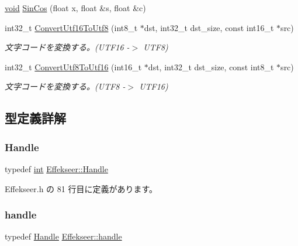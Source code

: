 \begin{DoxyCompactItemize}
\item 
\mbox{\hyperlink{namespace_effekseer_ab34c4088e512200cf4c2716f168deb56}{void}} \mbox{\hyperlink{namespace_effekseer_a4eab7724e1fc9c1cb66aac61b3d568d9}{Sin\+Cos}} (float x, float \&s, float \&c)
\item 
int32\+\_\+t \mbox{\hyperlink{namespace_effekseer_afcbbbacdf23834fd7e8619e3af4e837c}{Convert\+Utf16\+To\+Utf8}} (int8\+\_\+t $\ast$dst, int32\+\_\+t dst\+\_\+size, const int16\+\_\+t $\ast$src)
\begin{DoxyCompactList}\small\item\em 文字コードを変換する。(U\+T\+F16 -\/$>$ U\+T\+F8) \end{DoxyCompactList}\item 
int32\+\_\+t \mbox{\hyperlink{namespace_effekseer_abcfc5535cdc6dc92e50f8453cbb01214}{Convert\+Utf8\+To\+Utf16}} (int16\+\_\+t $\ast$dst, int32\+\_\+t dst\+\_\+size, const int8\+\_\+t $\ast$src)
\begin{DoxyCompactList}\small\item\em 文字コードを変換する。(U\+T\+F8 -\/$>$ U\+T\+F16) \end{DoxyCompactList}\end{DoxyCompactItemize}


\subsection{型定義詳解}
\mbox{\label{namespace_effekseer_afba58b8d812da862190e9bbfc040824a}} 
\subsubsection{\texorpdfstring{Handle}{Handle}}
{\footnotesize\ttfamily typedef \mbox{\hyperlink{namespace_effekseer_ace0abf7c2e6947e519ebe8b54cbcc30a}{int}} \mbox{\hyperlink{namespace_effekseer_afba58b8d812da862190e9bbfc040824a}{Effekseer\+::\+Handle}}}



 Effekseer.\+h の 81 行目に定義があります。

\mbox{\label{namespace_effekseer_afd99b336b206999bdcca3e431648efbc}} 
\subsubsection{\texorpdfstring{handle}{handle}}
{\footnotesize\ttfamily typedef \mbox{\hyperlink{namespace_effekseer_afba58b8d812da862190e9bbfc040824a}{Handle}} \mbox{\hyperlink{namespace_effekseer_afd99b336b206999bdcca3e431648efbc}{Effekseer\+::handle}}}



